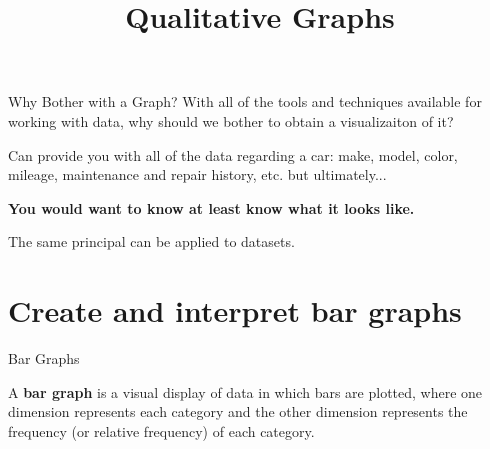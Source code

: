 \documentclass[t]{beamer}
\title{Qualitative Graphs}
\author{}
\date{}
\begin{document}
\begin{frame} 
\maketitle
\end{frame}

\begin{frame}{Why Bother with a Graph?}
With all of the tools and techniques available for working with data, why should we bother to obtain a visualizaiton of it?	\newline\\	\pause

Can provide you with all of the data regarding a car: make, model, color, mileage, maintenance and repair history, etc. but ultimately...	\pause
\begin{center}
\color{blue}\textbf{You would want to know at least know what it looks like.}
\end{center}
\vspace{10pt}	\pause
The same principal can be applied to datasets.
\end{frame}

\section{Create and interpret bar graphs}

\begin{frame}{Bar Graphs}
\begin{tcolorbox}[colframe=green!20!black, colback = green!30!white,title=\textbf{Bar Graph}]
A \textbf{bar graph} is a visual display of data in which bars are plotted, where one dimension represents each category and the other dimension represents the frequency (or relative frequency) of each category.
\end{tcolorbox}
\vspace{6pt}	\pause
\begin{center}
\end{center}
\end{frame}
\end{document}
